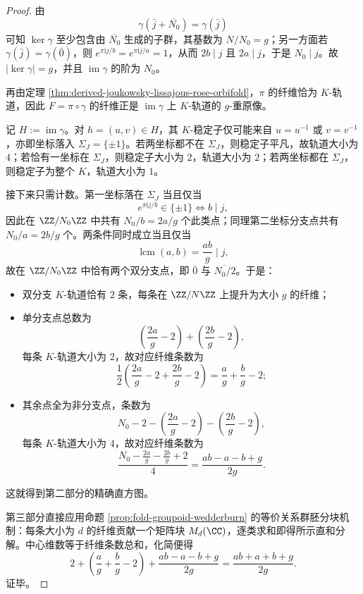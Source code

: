 \begin{proof}
由
\[
\gamma(\bar j+\overline{N_0})=\gamma(\bar j)
\]
可知 \(\ker\gamma\) 至少包含由 \(\overline{N_0}\) 生成的子群，其基数为 \(N/N_0=g\)；另一方面若 \(\gamma(\bar j)=\gamma(\bar 0)\)，则 \(e^{\pi \mathrm i j/b}=e^{\pi \mathrm i j/a}=1\)，从而 \(2b\mid j\) 且 \(2a\mid j\)，于是 \(N_0\mid j\)。故 \(|\ker\gamma|=g\)，并且 \(\operatorname{im}\gamma\) 的阶为 \(N_0\)。

再由定理 \ref{thm:derived-joukowsky-lissajous-rose-orbifold}，\(\pi\) 的纤维恰为 \(K\)-轨道，因此 \(F=\pi\circ\gamma\) 的纤维正是 \(\operatorname{im}\gamma\) 上 \(K\)-轨道的 \(g\)-重原像。

记 \(H:=\operatorname{im}\gamma\)。对 \(h=(u,v)\in H\)，其 \(K\)-稳定子仅可能来自 \(u=u^{-1}\) 或 \(v=v^{-1}\)，亦即坐标落入 \(\Sigma_J=\{\pm1\}\)。若两坐标都不在 \(\Sigma_J\)，则稳定子平凡，故轨道大小为 \(4\)；若恰有一坐标在 \(\Sigma_J\)，则稳定子大小为 \(2\)，轨道大小为 \(2\)；若两坐标都在 \(\Sigma_J\)，则稳定子为整个 \(K\)，轨道大小为 \(1\)。

接下来只需计数。第一坐标落在 \(\Sigma_J\) 当且仅当
\[
e^{\pi \mathrm i j/b}\in\{\pm1\}
\iff
b\mid j,
\]
因此在 \(\ZZ/N_0\ZZ\) 中共有 \(N_0/b=2a/g\) 个此类点；同理第二坐标分支点共有 \(N_0/a=2b/g\) 个。两条件同时成立当且仅当
\[
\operatorname{lcm}(a,b)=\frac{ab}{g}\mid j,
\]
故在 \(\ZZ/N_0\ZZ\) 中恰有两个双分支点，即 \(\bar 0\) 与 \(\overline{N_0/2}\)。于是：
\begin{itemize}
  \item 双分支 \(K\)-轨道恰有 \(2\) 条，每条在 \(\ZZ/N\ZZ\) 上提升为大小 \(g\) 的纤维；
  \item 单分支点总数为
  \[
  \left(\frac{2a}{g}-2\right)+\left(\frac{2b}{g}-2\right),
  \]
  每条 \(K\)-轨道大小为 \(2\)，故对应纤维条数为
  \[
  \frac12\left(\frac{2a}{g}-2+\frac{2b}{g}-2\right)
  =\frac{a}{g}+\frac{b}{g}-2;
  \]
  \item 其余点全为非分支点，条数为
  \[
  N_0-2-\left(\frac{2a}{g}-2\right)-\left(\frac{2b}{g}-2\right),
  \]
  每条 \(K\)-轨道大小为 \(4\)，故对应纤维条数为
  \[
  \frac{N_0-\frac{2a}{g}-\frac{2b}{g}+2}{4}
  =\frac{ab-a-b+g}{2g}.
  \]
\end{itemize}
这就得到第二部分的精确直方图。

第三部分直接应用命题 \ref{prop:fold-groupoid-wedderburn} 的等价关系群胚分块机制：每条大小为 \(d\) 的纤维贡献一个矩阵块 \(M_d(\CC)\)，逐类求和即得所示直和分解。中心维数等于纤维条数总和，化简便得
\[
2+\left(\frac{a}{g}+\frac{b}{g}-2\right)+\frac{ab-a-b+g}{2g}
=\frac{ab+a+b+g}{2g}.
\]
证毕。
\end{proof}

